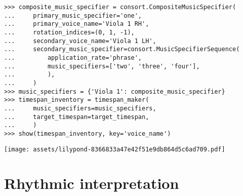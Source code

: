 \begin{comment}
<abjad>
composite_music_specifier = consort.CompositeMusicSpecifier(
    primary_music_specifier='one',
    primary_voice_name='Viola 1 RH',
    rotation_indices=(0, 1, -1),
    secondary_voice_name='Viola 1 LH',
    secondary_music_specifier=consort.MusicSpecifierSequence(
        application_rate='phrase',
        music_specifiers=['two', 'three', 'four'],
        ),
    )
music_specifiers = {'Viola 1': composite_music_specifier}
timespan_inventory = timespan_maker(
    music_specifiers=music_specifiers,
    target_timespan=target_timespan,
    )
show(timespan_inventory, key='voice_name')
</abjad>
\end{comment}

\begin{abjadbookoutput}
\begin{singlespacing}
\vspace{-0.5\baselineskip}
\begin{lstlisting}
>>> composite_music_specifier = consort.CompositeMusicSpecifier(
...     primary_music_specifier='one',
...     primary_voice_name='Viola 1 RH',
...     rotation_indices=(0, 1, -1),
...     secondary_voice_name='Viola 1 LH',
...     secondary_music_specifier=consort.MusicSpecifierSequence(
...         application_rate='phrase',
...         music_specifiers=['two', 'three', 'four'],
...         ),
...     )
>>> music_specifiers = {'Viola 1': composite_music_specifier}
>>> timespan_inventory = timespan_maker(
...     music_specifiers=music_specifiers,
...     target_timespan=target_timespan,
...     )
>>> show(timespan_inventory, key='voice_name')
\end{lstlisting}
\noindent\texttt{[image: assets/lilypond-8366833a47e42f51e9db864d5c6ad709.pdf]}
\end{singlespacing}
\end{abjadbookoutput}

\section{Rhythmic interpretation}
\label{sec:rhythmic-interpretation}

